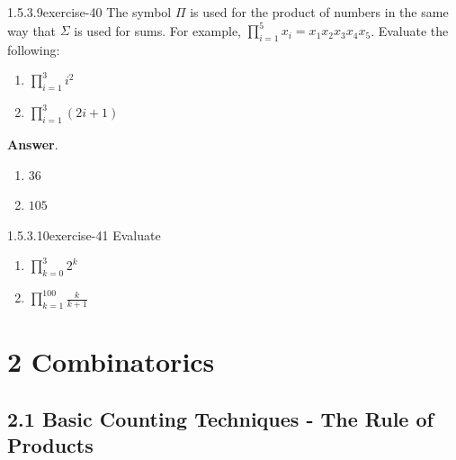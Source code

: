 \documentclass[twoside,10pt,]{book}
\numberwithin{equation}{section}
\begin{document}
\begin{divisionsolution}{1.5.3.9}{}{exercise-40}%
\hypertarget{p-552}{}%
The symbol \(\Pi\) is used for the product of numbers in the same way that \(\Sigma\) is used for sums. For example, \(\prod _{i=1}^5 x_i=x_1 x_2 x_3 x_4 x_5\). Evaluate the following:%
\par
\hypertarget{p-553}{}%
\leavevmode%
\begin{multicols}{2}
\begin{enumerate}[label=(\alph*)]
\item\hypertarget{li-393}{}\hypertarget{p-554}{}%
\(\prod _{i=1}^3 i^2\)%
\item\hypertarget{li-394}{}\hypertarget{p-555}{}%
\(\prod _{i=1}^3 (2i+1)\)%
\end{enumerate}
\end{multicols}
%
\par\smallskip%
\noindent\textbf{Answer}.\quad%
\hypertarget{p-556}{}%
\leavevmode%
\begin{multicols}{2}
\begin{enumerate}[label=(\alph*)]
\item\hypertarget{li-395}{}\hypertarget{p-557}{}%
\(36\)%
\item\hypertarget{li-396}{}\hypertarget{p-558}{}%
\(105\)%
\end{enumerate}
\end{multicols}
%
\end{divisionsolution}%
\begin{divisionsolution}{1.5.3.10}{}{exercise-41}%
\hypertarget{p-559}{}%
Evaluate%
\par
\hypertarget{p-560}{}%
\leavevmode%
\begin{multicols}{2}
\begin{enumerate}[label=(\alph*)]
\item\hypertarget{li-397}{}\hypertarget{p-561}{}%
\(\prod _{k=0}^3 2^k\)%
\item\hypertarget{li-398}{}\hypertarget{p-562}{}%
\(\prod _{k=1}^{100} \frac{k}{k+1}\)%
\end{enumerate}
\end{multicols}
%
\end{divisionsolution}%
\chapter*{2 Combinatorics}
\section*{2.1 Basic Counting Techniques - The Rule of Products}
\end{document}
